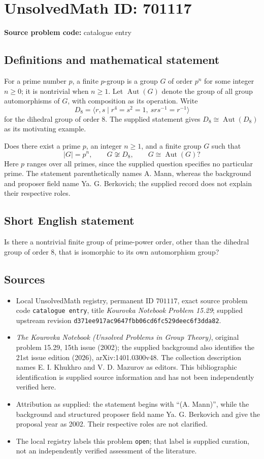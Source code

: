 \documentclass[11pt]{article}
\begin{document}
\section*{UnsolvedMath ID: 701117}
\textbf{Source problem code:} catalogue entry
\subsection{Definitions and mathematical statement}
For a prime number \(p\), a finite \(p\)-group is a group \(G\) of order \(p^n\) for some integer \(n\geq 0\); it is nontrivial when \(n\geq 1\). Let \(\operatorname{Aut}(G)\) denote the group of all group automorphisms of \(G\), with composition as its operation. Write
\[
D_8=\langle r,s\mid r^4=s^2=1,\ srs^{-1}=r^{-1}\rangle
\]
for the dihedral group of order \(8\). The supplied statement gives \(D_8\cong\operatorname{Aut}(D_8)\) as its motivating example.

Does there exist a prime \(p\), an integer \(n\geq 1\), and a finite group \(G\) such that
\[
|G|=p^n,\qquad G\not\cong D_8,\qquad G\cong\operatorname{Aut}(G)?
\]
Here \(p\) ranges over all primes, since the supplied question specifies no particular prime. The statement parenthetically names A. Mann, whereas the background and proposer field name Ya. G. Berkovich; the supplied record does not explain their respective roles.
\subsection{Short English statement}
Is there a nontrivial finite group of prime-power order, other than the dihedral group of order \(8\), that is isomorphic to its own automorphism group?
\subsection{Sources}
\begin{itemize}
\item Local UnsolvedMath registry, permanent ID \(701117\), exact source problem code \texttt{catalogue entry}, title \emph{Kourovka Notebook Problem 15.29}; supplied upstream revision \texttt{d371ee917ac9647fbb06cd6fc529deec6f3dda82}.
\item \emph{The Kourovka Notebook (Unsolved Problems in Group Theory)}, original problem 15.29, 15th issue (2002); the supplied background also identifies the 21st issue edition (2026), arXiv:1401.0300v48. The collection description names E. I. Khukhro and V. D. Mazurov as editors. This bibliographic identification is supplied source information and has not been independently verified here.
\item Attribution as supplied: the statement begins with ``(A. Mann)'', while the background and structured proposer field name Ya. G. Berkovich and give the proposal year as 2002. Their respective roles are not clarified.
\item The local registry labels this problem \texttt{open}; that label is supplied curation, not an independently verified assessment of the literature.
\end{itemize}
\end{document}
